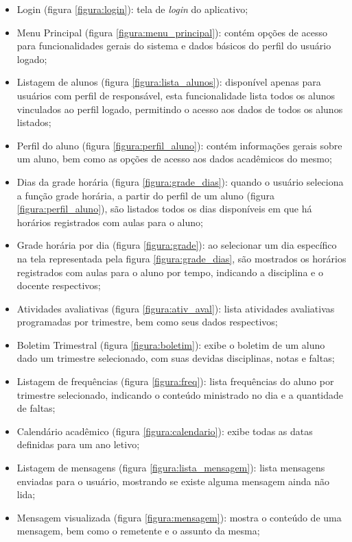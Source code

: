 \begin{itemize}
	\item Login (figura \ref{figura:login}): tela de \textit{login} do aplicativo;
	\item Menu Principal (figura \ref{figura:menu_principal}): contém opções de acesso para funcionalidades gerais do sistema e dados básicos do perfil do usuário logado;
	\item Listagem de alunos (figura \ref{figura:lista_alunos}): disponível apenas para usuários com perfil de responsável, esta funcionalidade lista todos os alunos vinculados ao perfil logado, permitindo o acesso aos dados de todos os alunos listados;
	\item Perfil do aluno (figura \ref{figura:perfil_aluno}): contém informações gerais sobre um aluno, bem como as opções de acesso aos dados acadêmicos do mesmo;
	\item Dias da grade horária (figura \ref{figura:grade_dias}): quando o usuário seleciona a função grade horária, a partir do perfil de um aluno (figura \ref{figura:perfil_aluno}), são listados todos os dias disponíveis em que há horários registrados com aulas para o aluno;
	\item Grade horária por dia (figura \ref{figura:grade}): ao selecionar um dia específico na tela representada pela figura \ref{figura:grade_dias}, são mostrados os horários registrados com aulas para o aluno por tempo, indicando a disciplina e o docente respectivos;
	\item Atividades avaliativas (figura \ref{figura:ativ_aval}): lista atividades avaliativas programadas por trimestre, bem como seus dados respectivos;
	\item Boletim Trimestral (figura \ref{figura:boletim}): exibe o boletim de um aluno dado um trimestre selecionado, com suas devidas disciplinas, notas e faltas;
	\item Listagem de frequências (figura \ref{figura:freq}): lista frequências do aluno por trimestre selecionado, indicando o conteúdo ministrado no dia e a quantidade de faltas;
	\item Calendário acadêmico (figura \ref{figura:calendario}): exibe todas as datas definidas para um ano letivo;
	\item Listagem de mensagens (figura \ref{figura:lista_mensagem}): lista mensagens enviadas para o usuário, mostrando se existe alguma mensagem ainda não lida;
	\item Mensagem visualizada (figura \ref{figura:mensagem}): mostra o conteúdo de uma mensagem, bem como o remetente e o assunto da mesma;
\end{itemize}

